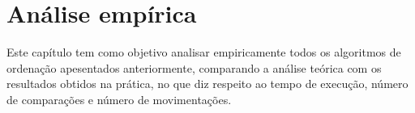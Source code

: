 \chapter{Análise empírica}\label{cap:analise-empirica}
Este capítulo tem como objetivo analisar empiricamente todos os algoritmos de ordenação apesentados anteriormente, comparando a análise teórica com os resultados obtidos na prática, no que diz respeito ao tempo de execução, número de comparações e número de movimentações.





